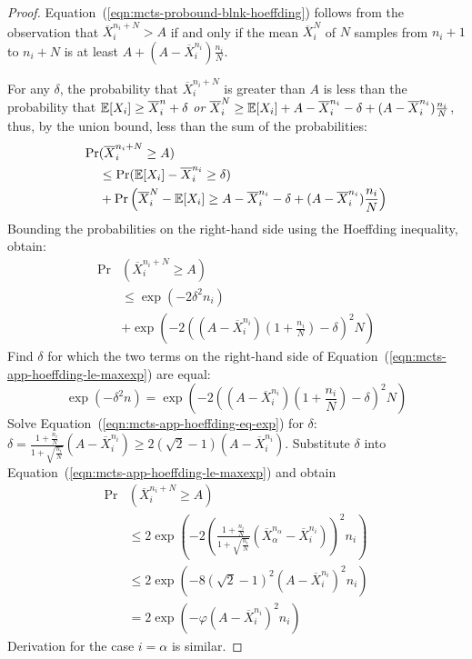 \begin{proof}
	Equation~(\ref{eqn:mcts-probound-blnk-hoeffding}) follows from
        the observation that $\overline X_i^{n_i+N}>A$ if and only if
        the mean $\overline X_i^N$ of $N$ samples from $n_i+1$ to
        $n_i+N$ is at least $A+(A-\overline X_i^{n_i})\frac {n_i} N$.

	For any $\delta$, the probability that $\overline X_i^{n_i+N}$ is greater
	than $A$ is less than the probability that
	$\mathbb{E}[X_i]\ge\overline X_i^n+\delta$
	\emph{or} $\overline X_i^N\ge \mathbb{E}[X_i]+A -\overline X_i^{n_i} - \delta +(A - \overline X_i^{n_i})\frac {n_i} N$,
	thus, by the union bound, less than the sum of the probabilities:
	\begin{align}
	\Pr&(\overline X_i^{n_i+N}\ge A)\nonumber\\
	   &\le\Pr(\mathbb{E}[X_i]-\overline X_i^{n_i} \ge \delta)\\
	   &+\Pr\left(\overline X_i^N - \mathbb{E}[X_i] \ge A
	           - \overline X_i^{n_i} - \delta +(A - \overline X_i^{n_i})\frac {n_i} N\right)\nonumber
	\end{align}
	Bounding the probabilities on the right-hand side using the Hoeffding
	inequality, obtain:
	\begin{align}
	\Pr&(\overline X_i^{n_i+N}\ge A)\nonumber\\
	    &\le\exp(-2\delta^2n_i)\nonumber\\
	    &+\exp\left(-2\left((A - \overline X_i^{n_i})\left(1+\frac {n_i} N\right)-\delta\right)^2N\right)
	\label{eqn:mcts-app-hoeffding-le-maxexp}
	\end{align}
	Find $\delta$ for which the two terms on the right-hand side of
	Equation~(\ref{eqn:mcts-app-hoeffding-le-maxexp}) are equal:
	\begin{equation}
	\exp(-\delta^2n) = \exp\left(-2\left((A - \overline X_i^{n_i})(1+\frac {n_i} N) - \delta\right)^2N\right)\label{eqn:mcts-app-hoeffding-eq-exp}
	\end{equation}
	Solve Equation~(\ref{eqn:mcts-app-hoeffding-eq-exp}) for $\delta$: $\delta=\frac {1+\frac {n_i} N} {1+\sqrt {\frac {n_i} N}} (A - \overline X_i^{n_i}) \ge 2(\sqrt 2 - 1)(A-\overline X_i^{n_i})$. Substitute $\delta$ into 
	Equation~(\ref{eqn:mcts-app-hoeffding-le-maxexp}) and obtain
	\begin{align}
	\Pr&(\overline X_i^{n_i+N}\ge A) \nonumber\\
	& \le 2\exp\left(-2\left( \frac {1+\frac {n_i} N} {1+\sqrt {\frac {n_i} N}}
	                          (\overline X_\alpha^{n_\alpha} - \overline X_i^{n_i})\right)^2 n_i\right)\nonumber \\
	& \le 2\exp(-8(\sqrt 2 - 1)^2(A - \overline X_i^{n_i})^2n_i)\nonumber\\
	& = 2\exp(-\varphi(A - \overline X_i^{n_i})^2n_i)
	\end{align}
	Derivation for the case $i=\alpha$ is similar.
\end{proof}	

